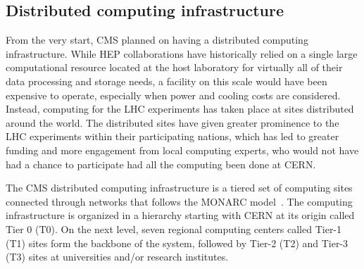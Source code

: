 \subsection{Distributed computing infrastructure}





From the very start, CMS planned on having a distributed computing
infrastructure.  While HEP collaborations have historically relied on a single
large computational resource located at the host laboratory for virtually all of
their data processing and storage needs, a facility on this scale would
have been expensive to operate, especially when power and cooling costs are
considered.  Instead, computing for the LHC experiments has taken place at
sites distributed around the world.  The distributed sites have given
greater prominence to the LHC experiments within their participating
nations, which has led to greater funding and more engagement from local
computing experts, who would not have had a chance to participate had all
the computing been done at CERN.

The CMS distributed computing infrastructure is a tiered set of computing
sites connected through networks that follows the MONARC
model~\cite{MONARC}. The computing infrastructure is organized in a
hierarchy starting with CERN at its origin called Tier 0 (T0).  On the next
level, seven regional computing centers called Tier-1 (T1) sites form the
backbone of the system, followed by Tier-2 (T2) and Tier-3 (T3) sites at
universities and/or research institutes.  

